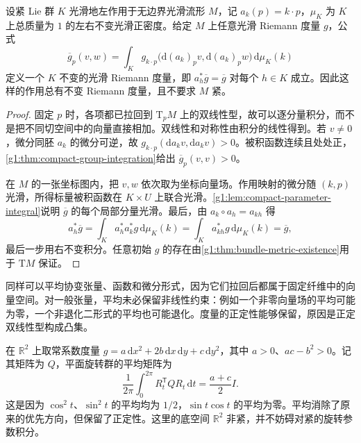\begin{theorem}\label{g1:thm:compact-group-average}
	设紧 Lie 群 \(K\) 光滑地左作用于无边界光滑流形 \(M\)，记 \(a_k(p)=k\cdot p\)，\(\mu_K\) 为 \(K\) 上总质量为 \(1\) 的左右不变光滑正密度。给定 \(M\) 上任意光滑 Riemann 度量 \(g\)，公式
	\begin{equation}\label{g1:eq:averaged-metric}
		\overline g_p(v,w)
		=\int_K g_{k\cdot p}\bigl(\mathrm{d}(a_k)_pv,
		\mathrm{d}(a_k)_pw\bigr)\,\mathrm{d}\mu_K(k)
	\end{equation}
	定义一个 \(K\) 不变的光滑 Riemann 度量，即 \(a_h^*\overline g=\overline g\) 对每个 \(h\in K\) 成立。因此这样的作用总有不变 Riemann 度量，且不要求 \(M\) 紧。
\end{theorem}
\begin{proof}
	固定 \(p\) 时，各项都已拉回到 \(\mathrm{T}_pM\) 上的双线性型，故可以逐分量积分，而不是把不同切空间中的向量直接相加。双线性和对称性由积分的线性得到。若 \(v\ne0\)，微分同胚 \(a_k\) 的微分可逆，故 \(g_{k\cdot p}(\mathrm{d}a_kv,\mathrm{d}a_kv)>0\)。被积函数连续且处处正，\cref{g1:thm:compact-group-integration}给出 \(\overline g_p(v,v)>0\)。

	在 \(M\) 的一张坐标图内，把 \(v,w\) 依次取为坐标向量场。作用映射的微分随 \((k,p)\) 光滑，所得标量被积函数在 \(K\times U\) 上联合光滑。\cref{g1:lem:compact-parameter-integral}说明 \(\overline g\) 的每个局部分量光滑。最后，由 \(a_k\circ a_h=a_{kh}\) 得
	\[
		a_h^*\overline g
		=\int_K a_h^*a_k^*g\,\mathrm{d}\mu_K(k)
		=\int_K a_{kh}^*g\,\mathrm{d}\mu_K(k)
		=\overline g,
	\]
	最后一步用右不变积分。任意初始 \(g\) 的存在由\cref{g1:thm:bundle-metric-existence}用于 \(\mathrm{T}M\) 保证。
\end{proof}

同样可以平均协变张量、函数和微分形式，因为它们拉回后都属于固定纤维中的向量空间。对一般张量，平均未必保留非线性约束：例如一个非零向量场的平均可能为零，一个非退化二形式的平均也可能退化。度量的正定性能够保留，原因是正定双线性型构成凸集。

\begin{example}\label{g1:exm:rotation-average-metric}
	在 \(\mathbb R^2\) 上取常系数度量 \(g=a\,\mathrm{d}x^2+2b\,\mathrm{d}x\,\mathrm{d}y+c\,\mathrm{d}y^2\)，其中 \(a>0\)、\(ac-b^2>0\)。记其矩阵为 \(Q\)，平面旋转群的平均矩阵为
	\[
		\frac1{2\pi}\int_0^{2\pi}R_t^{\mathsf T}QR_t\,\mathrm{d}t
		=\frac{a+c}{2}I.
	\]
	这是因为 \(\cos^2t\)、\(\sin^2t\) 的平均均为 \(1/2\)，\(\sin t\cos t\) 的平均为零。平均消除了原来的优先方向，但保留了正定性。这里的底空间 \(\mathbb R^2\) 非紧，并不妨碍对紧的旋转参数积分。
\end{example}

